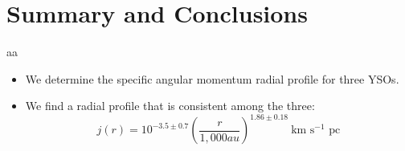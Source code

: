 \section{Summary and Conclusions}
aa
\begin{itemize}
\item We determine the specific angular momentum radial profile for three YSOs. 
\item We find a radial profile that is consistent among the three:
\[ j(r) = 10^{-3.5\pm0.7}\left( \frac{r}{1,000 au}\right)^{1.86\pm 0.18}~\textrm{km s$^{-1}$ pc}\]
\end{itemize}
  
  